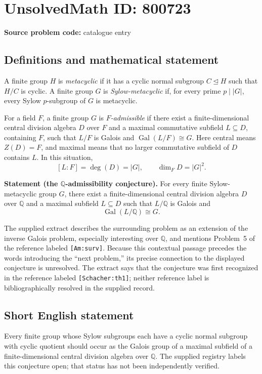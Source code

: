 \documentclass[11pt]{article}
\newcommand{\Q}{\mathbb{Q}}
\begin{document}
\section*{UnsolvedMath ID: 800723}
\textbf{Source problem code:} catalogue entry
\subsection{Definitions and mathematical statement}
A finite group \(H\) is \emph{metacyclic} if it has a cyclic normal subgroup \(C\trianglelefteq H\) such that \(H/C\) is cyclic. A finite group \(G\) is \emph{Sylow-metacyclic} if, for every prime \(p\mid |G|\), every Sylow \(p\)-subgroup of \(G\) is metacyclic.

For a field \(F\), a finite group \(G\) is \emph{\(F\)-admissible} if there exist a finite-dimensional central division algebra \(D\) over \(F\) and a maximal commutative subfield \(L\subseteq D\), containing \(F\), such that \(L/F\) is Galois and \(\operatorname{Gal}(L/F)\cong G\). Here central means \(Z(D)=F\), and maximal means that no larger commutative subfield of \(D\) contains \(L\). In this situation,
\[
[L:F]=\deg(D)=|G|,\qquad \dim_F D=|G|^2.
\]

\textbf{Statement (the \(\Q\)-admissibility conjecture).} For every finite Sylow-metacyclic group \(G\), there exist a finite-dimensional central division algebra \(D\) over \(\Q\) and a maximal subfield \(L\subseteq D\) such that \(L/\Q\) is Galois and
\[
\operatorname{Gal}(L/\Q)\cong G.
\]

The supplied extract describes the surrounding problem as an extension of the inverse Galois problem, especially interesting over \(\Q\), and mentions Problem~5 of the reference labeled \texttt{[Am:surv]}. Because this contextual passage precedes the words introducing the ``next problem,'' its precise connection to the displayed conjecture is unresolved. The extract says that the conjecture was first recognized in the reference labeled \texttt{[Schacher:th1]}; neither reference label is bibliographically resolved in the supplied record.
\subsection{Short English statement}
Every finite group whose Sylow subgroups each have a cyclic normal subgroup with cyclic quotient should occur as the Galois group of a maximal subfield of a finite-dimensional central division algebra over \(\Q\). The supplied registry labels this conjecture open; that status has not been independently verified.
\end{document}
